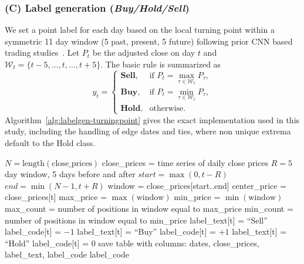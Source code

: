\documentclass[12pt,a4paper]{article}
\begin{document}
\subsubsection*{(C) Label generation (\textit{Buy/Hold/Sell})}
We set a point label for each day based on the local turning point within a symmetric 11 day window (5 past, present, 5 future) following prior CNN based trading studies~\cite{maratkhan2021deep}.
Let $P_t$ be the adjusted close on day $t$ and $\mathcal{W}_t = \{t-5, \ldots, t, \ldots, t+5\}$.
The basic rule is summarized as
\begin{equation}
	y_t =
	\begin{cases}
		\textbf{Sell}, & \text{if } P_t = \max\limits_{\tau \in \mathcal{W}_t} P_\tau,\\[4pt]
		\textbf{Buy},  & \text{if } P_t = \min\limits_{\tau \in \mathcal{W}_t} P_\tau,\\[4pt]
		\textbf{Hold}, & \text{otherwise.}
	\end{cases}
	\label{eq:label}
\end{equation}
Algorithm~\ref{alg:labelgen-turningpoint} gives the exact implementation used in this study, including the handling of edge dates and ties, where non unique extrema default to the Hold class.

\begin{algorithm}
	\footnotesize
	\caption{Turning point label generation (Buy, Hold, Sell)}
	\label{alg:labelgen-turningpoint}
	\begin{algorithmic}[1]
		\State $N = \text{length}(\text{close\_prices})$ \Comment close\_prices = time series of daily close prices
		\State $R = 5$  day window, 5 days before and after
		\State $start = \max(0, t - R)$
		\State $end = \min(N - 1, t + R)$
		\State window = close\_prices[start..end] 
		\State center\_price = close\_prices[t]
		\State max\_price = $\max(\text{window})$
		\State min\_price = $\min(\text{window})$
		\State max\_count = number of positions in window equal to max\_price
		\State min\_count = number of positions in window equal to min\_price
		\State label\_text[t] = ``Sell''
		\State label\_code[t] = $-1$
		\State label\_text[t] = ``Buy''
		\State label\_code[t] = $+1$
		\Else
		\State label\_text[t] = ``Hold''
		\State label\_code[t] = $0$
		\EndIf
		\EndFor
		\State save table with columns: dates, close\_prices, label\_text, label\_code
		\State \Return label\_code
		\EndProcedure
	\end{algorithmic}
\end{algorithm}
\end{document}
